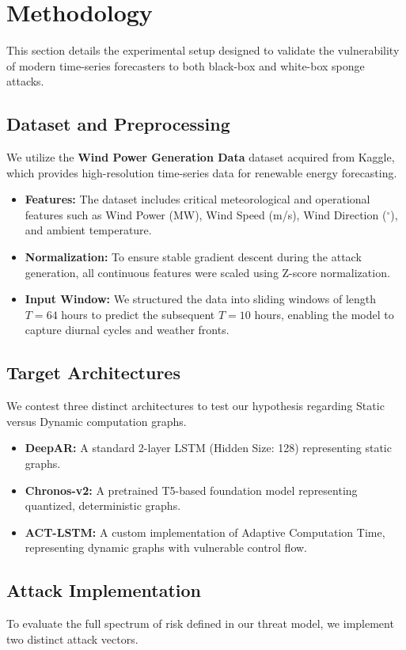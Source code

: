\section{Methodology}
\label{sec:experiments}

This section details the experimental setup designed to validate the vulnerability of modern time-series forecasters to both black-box and white-box sponge attacks.

\subsection{Dataset and Preprocessing}
We utilize the \textbf{Wind Power Generation Data} dataset acquired from Kaggle, which provides high-resolution time-series data for renewable energy forecasting.
\begin{itemize}
    \item \textbf{Features:} The dataset includes critical meteorological and operational features such as Wind Power (MW), Wind Speed (m/s), Wind Direction ($^\circ$), and ambient temperature.
    \item \textbf{Normalization:} To ensure stable gradient descent during the attack generation, all continuous features were scaled using Z-score normalization.
    \item \textbf{Input Window:} We structured the data into sliding windows of length $T=64$ hours to predict the subsequent $T=10$ hours, enabling the model to capture diurnal cycles and weather fronts.
\end{itemize}

\subsection{Target Architectures}
We contest three distinct architectures to test our hypothesis regarding Static versus Dynamic computation graphs.
\begin{itemize}
    \item \textbf{DeepAR:} A standard 2-layer LSTM (Hidden Size: 128) representing static graphs.
    \item \textbf{Chronos-v2:} A pretrained T5-based foundation model representing quantized, deterministic graphs.
    \item \textbf{ACT-LSTM:} A custom implementation of Adaptive Computation Time, representing dynamic graphs with vulnerable control flow.
\end{itemize}

\subsection{Attack Implementation}
To evaluate the full spectrum of risk defined in our threat model, we implement two distinct attack vectors.

